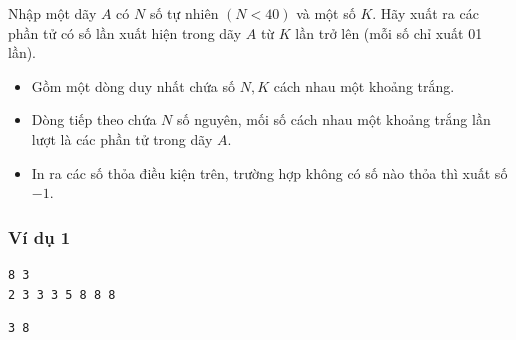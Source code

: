 
Nhập một dãy $A$ có $N$ số tự nhiên $(N < 40)$ và một số $K$. Hãy xuất ra các phần tử có số lần xuất hiện trong dãy $A$ từ $K$ lần trở lên (mỗi số chỉ xuất 01 lần).

\begin{itemize}
    \item Gồm một dòng duy nhất chứa số $N, K$ cách nhau một khoảng trắng.
    \item Dòng tiếp theo chứa $N$ số nguyên, mối số cách nhau một khoảng trắng lần lượt là các phần tử trong dãy $A$.
\end{itemize}

\begin{itemize}
    \item In ra các số thỏa điều kiện trên, trường hợp không có số nào thỏa thì xuất số $-1$.
\end{itemize}


\subsubsection*{Ví dụ 1}
\begin{makesample}
\begin{lstlisting}
8 3
2 3 3 3 5 8 8 8
\end{lstlisting}
\nextsample
\begin{lstlisting}
3 8
\end{lstlisting}
\end{makesample}
